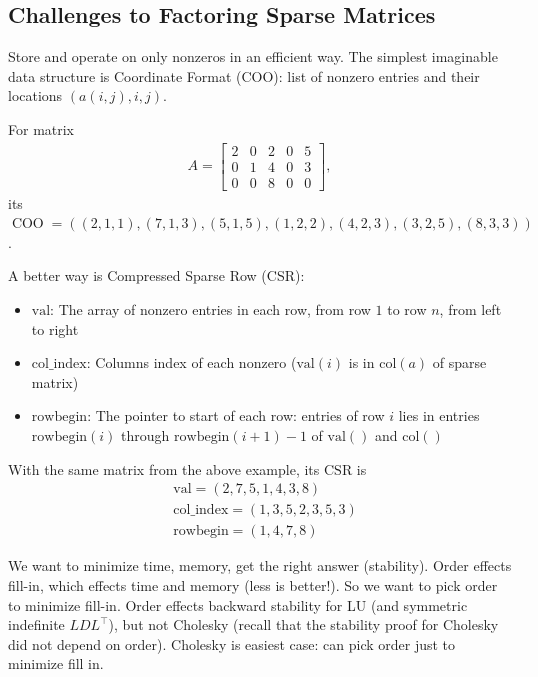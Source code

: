 \documentclass[11pt]{article}
\numberwithin{equation}{section}
\begin{document}
\subsection{Challenges to Factoring Sparse Matrices}
Store and operate on only nonzeros in an efficient way. The simplest imaginable data structure is Coordinate Format (COO):
list of nonzero entries and their locations $(a(i, j), i, j)$.
\begin{example}
    For matrix \begin{align*}
        A=\left[\begin{array}{lllll}
            2 & 0 & 2 & 0 & 5 \\
            0 & 1 & 4 & 0 & 3 \\
            0 & 0 & 8 & 0 & 0
            \end{array}\right],
    \end{align*}its $\operatorname{COO} = ((2,1,1),(7,1,3),(5,1,5),(1,2,2),(4,2,3),(3,2,5),(8,3,3))$.
\end{example}

A better way is  Compressed Sparse Row (CSR):\begin{itemize}
    \item $\mathrm{val}$: The array of nonzero entries in each row, from row $1$ to row $n$, from left to right
    \item $\mathrm{col\_index}$: Columns index of each nonzero ($\mathrm{val}(i)$ is in $\mathrm{col}(a)$ of sparse matrix)
    \item $\mathrm{rowbegin}$: The pointer to start of each row: entries of row $i$ lies in entries $\mathrm{rowbegin}(i)$ through $\mathrm{rowbegin}(i+1)-1$ of $\mathrm{val}()$ and $\mathrm{col}()$
\end{itemize}

\begin{example}
    With the same matrix from the above example, its $\mathrm{CSR}$ is \begin{align*}
        &\mathrm{val} = (2, 7, 5, 1, 4, 3, 8) \\
        &\mathrm{col\_index} = (1, 3, 5, 2, 3, 5, 3) \\
        &\mathrm{rowbegin} = (1, 4, 7, 8) 
    \end{align*}
\end{example}

We want to minimize time, memory, get the right answer (stability). Order effects fill-in, which effects time and memory (less is better!).
So we want to pick order to minimize fill-in. Order effects backward stability for LU (and symmetric indefinite $LDL^\top$), 
but not Cholesky (recall that the stability proof for Cholesky did not depend on order).
Cholesky is easiest case: can pick order just to minimize fill in.
\end{document}
